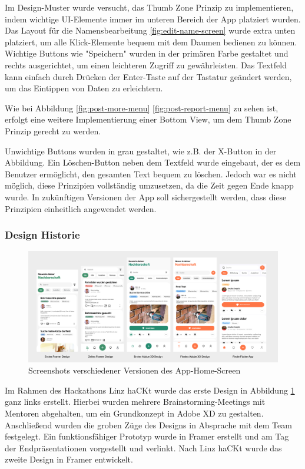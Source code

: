 Im Design-Muster wurde versucht, das Thumb Zone Prinzip zu
implementieren, indem wichtige UI-Elemente immer im unteren
Bereich der App platziert wurden. Das Layout für die
Namensbearbeitung \ref{fig:edit-name-screen} wurde extra
unten platziert, um alle Klick-Elemente bequem mit dem
Daumen bedienen zu können. Wichtige Buttons wie "Speichern"
wurden in der primären Farbe gestaltet und rechts
ausgerichtet, um einen leichteren Zugriff zu gewährleisten.
Das Textfeld kann einfach durch Drücken der Enter-Taste auf
der Tastatur geändert werden, um das Eintippen von Daten zu
erleichtern.

Wie bei Abbildung \ref{fig:post-more-menu} \ref{fig:post-report-menu} zu sehen ist, erfolgt eine weitere Implementierung einer Bottom View, um dem Thumb Zone Prinzip gerecht zu werden.

Unwichtige Buttons wurden in grau gestaltet, wie z.B. der X-Button in der Abbildung. Ein Löschen-Button neben dem Textfeld wurde eingebaut, der es dem Benutzer ermöglicht, den gesamten Text bequem zu löschen. Jedoch war es nicht möglich, diese Prinzipien vollständig umzusetzen, da die Zeit gegen Ende knapp wurde. In zukünftigen Versionen der App soll sichergestellt werden, dass diese Prinzipien einheitlich angewendet werden.
\subsubsection{Design Historie}

\begin{figure}[h]
  \centering
  \includegraphics[width=1\textwidth]{pics/app-design-history.png}
  \caption{Screenshots verschiedener Versionen des App-Home-Screen}
  \label{fig:app-design-history}
\end{figure}
Im Rahmen des Hackathons Linz haCKt wurde das erste Design in Abbildung \ref{fig:app-design-history} ganz links erstellt. Hierbei wurden mehrere Brainstorming-Meetings mit Mentoren abgehalten, um ein Grundkonzept in Adobe XD zu gestalten. Anschließend wurden die groben Züge des Designs in Absprache mit dem Team festgelegt. Ein funktionsfähiger Prototyp wurde in Framer erstellt und am Tag der Endpräsentationen vorgestellt und verlinkt. Nach Linz haCKt wurde das zweite Design in Framer entwickelt.

